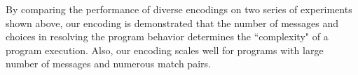 By comparing the performance of diverse encodings on two series of experiments shown above, our encoding is demonstrated that the number of messages and choices in resolving the program behavior determines the ``complexity" of a program execution. Also, our encoding scales well for programs with large number of messages and numerous match pairs.

